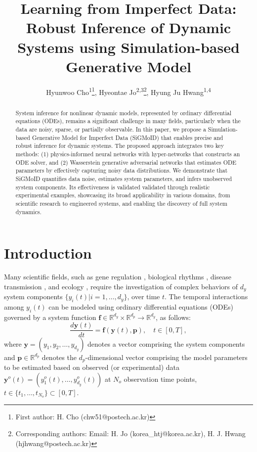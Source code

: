 \documentclass[letterpaper]{article} %
\title{Learning from Imperfect Data: Robust Inference of Dynamic Systems using Simulation-based Generative Model}
\author{
    Hyunwoo Cho\textsuperscript{\rm 1}\thanks{First author: H. Cho (chw51@postech.ac.kr)}, %
    Hyeontae Jo\textsuperscript{\rm 2,3}\thanks{Corresponding authors: Email: H. Jo (korea\_htj@korea.ac.kr), H. J. Hwang (hjhwang@postech.ac.kr)}, Hyung Ju Hwang\textsuperscript{\rm 1,4}\footnotemark[2]
}
\theoremstyle{thmstyleone}%
\theoremstyle{thmstyletwo}%
\theoremstyle{thmstylethree}%
\begin{document}
\maketitle

\begin{abstract}
System inference for nonlinear dynamic models, represented by ordinary differential equations (ODEs), remains a significant challenge in many fields, particularly when the data are noisy, sparse, or partially observable. In this paper, we propose a Simulation-based Generative Model for Imperfect Data (SiGMoID) that enables precise and robust inference for dynamic systems. The proposed approach integrates two key methods: (1) physics-informed neural networks with hyper-networks that constructs an ODE solver, and (2) Wasserstein generative adversarial networks that estimates ODE parameters by effectively capturing noisy data distributions. We demonstrate that SiGMoID quantifies data noise, estimates system parameters, and infers unobserved system components. Its effectiveness is validated validated through realistic experimental examples, showcasing its broad applicability in various domains, from scientific research to engineered systems, and enabling the discovery of full system dynamics.
\end{abstract}

\begin{links}
\end{links}

\section{Introduction}

Many scientific fields, such as gene regulation \cite{hirata2002oscillatory, jo2024density}, biological rhythms \cite{forger2024biological}, disease transmission \cite{smith2018influenza, jung2020real, hong2024overcoming}, and ecology \cite{busenberg2012differential}, require the investigation of complex behaviors of $d_y$ system components $\{y_i(t)|i=1,\dots,d_y\}$, over time $t$. The temporal interactions among $y_i(t)$ can be modeled using ordinary differential equations (ODEs) governed by a system function $\mathbf{f}\in\mathbb{R}^{d_y}\times\mathbb{R}^{d_p}\rightarrow\mathbb{R}^{d_y}$, as follows:
\begin{equation}\label{general_ode}
\frac{d\mathbf{y}(t)}{dt}=\mathbf{f}(\mathbf{y}(t),\mathbf{p}),\quad t\in[0,T], 
\end{equation}
where $\mathbf{y}=(y_1,y_2,\dots,y_{d_y})$ denotes a vector comprising the system components and $\mathbf{p}\in\mathbb{R}^{d_p}$ denotes the $d_p$-dimensional vector comprising the model parameters to be estimated based on observed (or experimental) data $\mathbf{y}^{o}(t) = (y^{o}_{1}(t),\dots, y^{o}_{d_y}(t))$ at $N_{o}$ observation time points, $t\in\{t_{1},\dots,t_{N_{o}}\}\subset [0,T]$.
\end{document}
